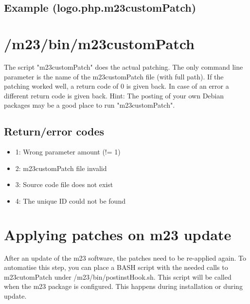 \subsection{Example (logo.php.m23customPatch)}


\section{/m23/bin/m23customPatch}
The script "m23customPatch" does the actual patching. The only command line parameter is the name of the m23customPatch file (with full path). If the patching worked well, a return code of 0 is given back. In case of an error a different return code is given back. Hint: The posting of your own Debian packages may be a good place to run "m23customPatch".

\subsection{Return/error codes}

\begin{itemize}
	\item 1: Wrong parameter amount (!= 1)
	\item 2: m23customPatch file invalid
	\item 3: Source code file does not exist
	\item 4: The unique ID could not be found
\end{itemize}





\section{Applying patches on m23 update}
After an update of the m23 software, the patches need to be re-applied again. To automatise this step, you can place a BASH script with the needed calls to m23cutomPatch under /m23/bin/postinstHook.sh. This script will be called when the m23 package is configured. This happens during installation or during update.